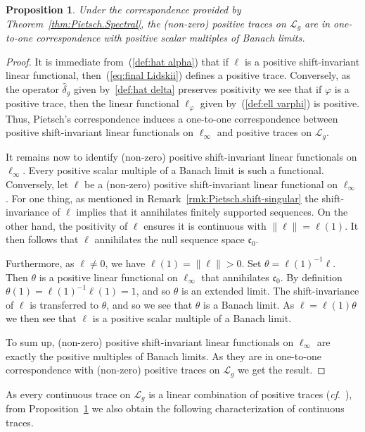 \documentclass[10pt, a4paper]{amsart}
\newcommand{\sL}{\mathscr{L}}
\newcommand{\co}{\mathfrak{c}_{0}}
\numberwithin{equation}{section}
\newtheorem{proposition}[theorem]{Proposition}
\theoremstyle{definition}
\theoremstyle{remark}
\begin{document}
\begin{proposition}\label{prop:Pietsch.positive-traces}
 Under the correspondence provided by Theorem~\ref{thm:Pietsch.Spectral}, the (non-zero) positive traces on $\sL_g$ are in one-to-one correspondence with positive scalar multiples of Banach limits.
\end{proposition}
\begin{proof}
It is immediate from~(\ref{def:hat alpha}) that if $\ell$ is a positive shift-invariant linear functional, then~(\ref{eq:final Lidskii}) defines a positive trace. Conversely, as the operator $\hat{\delta}_g$ given by~\eqref{def:hat delta} preserves positivity we see that if $\varphi$ is a positive trace, then the linear functional $\ell_\varphi$ given by~(\ref{def:ell varphi}) is positive. Thus, Pietsch's correspondence induces a one-to-one correspondence between positive shift-invariant linear functionals on $\ell_\infty$ and positive traces on $\sL_g$.

It remains now to identify (non-zero) positive shift-invariant linear functionals on $\ell_\infty$. Every positive scalar multiple of a Banach limit is such a functional.
Conversely, let $\ell$ be a (non-zero) positive shift-invariant linear functional on $\ell_\infty$.  For one thing, as mentioned in Remark~\ref{rmk:Pietsch.shift-singular} the shift-invariance of $\ell$ implies that it annihilates finitely supported sequences. On the other hand, the positivity of $\ell$ ensures it is continuous with $\|\ell\|=\ell(1)$.  It then follows that $\ell$ annihilates the null sequence space $\co$.

Furthermore, as $\ell\neq 0$, we have $\ell(1)=\|\ell\|>0$. Set $\theta= \ell(1)^{-1}\ell$. Then $\theta$ is a positive linear functional on $\ell_\infty$ that annihilates $\co$. By definition $\theta(1)= \ell(1)^{-1}\ell(1)=1$, and so $\theta$ is an extended limit. The shift-invariance of $\ell$ is transferred to $\theta$, and so we see that $\theta$ is a Banach limit. As $\ell=\ell(1)\theta$ we then see that $\ell$ is a positive scalar multiple of a Banach limit.

To sum up, (non-zero) positive shift-invariant linear functionals on $\ell_\infty$ are exactly the positive multiples of Banach limits. As they are in one-to-one correspondence with (non-zero)  positive traces on $\sL_g$ we get the result.
 \end{proof}

As every continuous trace on $\sL_g$ is a linear combination of positive traces (\emph{cf}.~\cite[Theorem~4.1.10]{LSZ:Book}), from Proposition~\ref{prop:Pietsch.positive-traces} we also obtain the following characterization of continuous traces.
\end{document}
